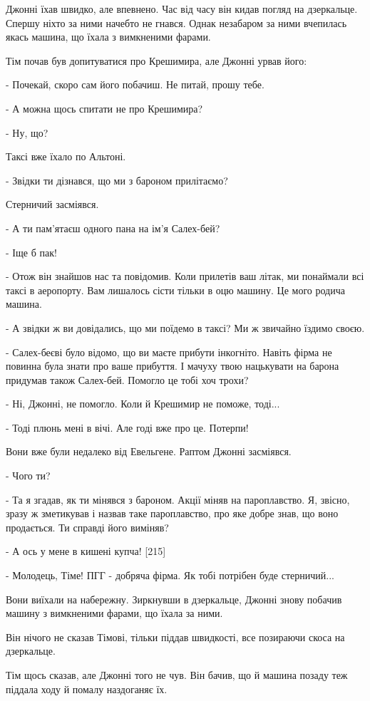 Джонні їхав швидко, але впевнено. Час від часу він кидав погляд на дзеркальце. Спершу ніхто за ними начебто не гнався. Однак незабаром за ними вчепилась якась машина, що їхала з вимкненими фарами.

Тім почав був допитуватися про Крешимира, але Джонні урвав його:

- Почекай, скоро сам його побачиш. Не питай, прошу тебе.

- А можна щось спитати не про Крешимира?

- Ну, що?

Таксі вже їхало по Альтоні.

- Звідки ти дізнався, що ми з бароном прилітаємо?

Стерничий засміявся.

- А ти пам'ятаєш одного пана на ім'я Салех-бей?

- Іще б пак!

- Отож він знайшов нас та повідомив. Коли прилетів ваш літак, ми понаймали всі таксі в аеропорту. Вам лишалось сісти тільки в оцю машину. Це мого родича машина.

- А звідки ж ви довідались, що ми поїдемо в таксі? Ми ж звичайно їздимо своєю.

- Салех-беєві було відомо, що ви маєте прибути інкогніто. Навіть фірма не повинна була знати про ваше прибуття. І мачуху твою нацькувати на барона придумав також Салех-бей. Помогло це тобі хоч трохи?

- Ні, Джонні, не помогло. Коли й Крешимир не поможе, тоді...

- Тоді плюнь мені в вічі. Але годі вже про це. Потерпи!

Вони вже були недалеко від Евельгене. Раптом Джонні засміявся.

- Чого ти?

- Та я згадав, як ти мінявся з бароном. Акції міняв на пароплавство. Я, звісно, зразу ж зметикував і назвав таке пароплавство, про яке добре знав, що воно продається. Ти справді його виміняв?

- А ось у мене в кишені купча! [215]

- Молодець, Тіме! ПГГ - добряча фірма. Як тобі потрібен буде стерничий...

Вони виїхали на набережну. Зиркнувши в дзеркальце, Джонні знову побачив машину з вимкненими фарами, що їхала за ними.

Він нічого не сказав Тімові, тільки піддав швидкості, все позираючи скоса на дзеркальце.

Тім щось сказав, але Джонні того не чув. Він бачив, що й машина позаду теж піддала ходу й помалу наздоганяє їх.

